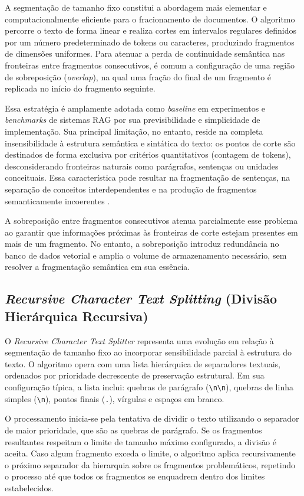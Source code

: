 \documentclass[
	12pt,				%
	openright,			%
	oneside,			%
	a4paper,			%
	tccpreliminar,		%
	]{ABNT-DC-UEL}
\begin{document}
A segmentação de tamanho fixo constitui a abordagem mais elementar e computacionalmente eficiente para o fracionamento de documentos. O algoritmo percorre o texto de forma linear e realiza cortes em intervalos regulares definidos por um número predeterminado de tokens ou caracteres, produzindo fragmentos de dimensões uniformes. Para atenuar a perda de continuidade semântica nas fronteiras entre fragmentos consecutivos, é comum a configuração de uma região de sobreposição (\textit{overlap}), na qual uma fração do final de um fragmento é replicada no início do fragmento seguinte.

Essa estratégia é amplamente adotada como \textit{baseline} em experimentos e \textit{benchmarks} de sistemas RAG \cite{wang2024bestpractices} por sua previsibilidade e simplicidade de implementação. Sua principal limitação, no entanto, reside na completa insensibilidade à estrutura semântica e sintática do texto: os pontos de corte são destinados de forma exclusiva por critérios quantitativos (contagem de tokens), desconsiderando fronteiras naturais como parágrafos, sentenças ou unidades conceituais. Essa característica pode resultar na fragmentação de sentenças, na separação de conceitos interdependentes e na produção de fragmentos semanticamente incoerentes \cite{barnett2024failure}.

A sobreposição entre fragmentos consecutivos atenua parcialmente esse problema ao garantir que informações próximas às fronteiras de corte estejam presentes em mais de um fragmento. No entanto, a sobreposição introduz redundância no banco de dados vetorial e amplia o volume de armazenamento necessário, sem resolver a fragmentação semântica em sua essência.

\subsection{\textit{Recursive Character Text Splitting} (Divisão Hierárquica Recursiva)}

O \textit{Recursive Character Text Splitter} representa uma evolução em relação à segmentação de tamanho fixo ao incorporar sensibilidade parcial à estrutura do texto. O algoritmo opera com uma lista hierárquica de separadores textuais, ordenados por prioridade decrescente de preservação estrutural. Em sua configuração típica, a lista inclui: quebras de parágrafo (\verb|\n\n|), quebras de linha simples (\verb|\n|), pontos finais (\verb|.|), vírgulas e espaços em branco.

O processamento inicia-se pela tentativa de dividir o texto utilizando o separador de maior prioridade, que são as quebras de parágrafo. Se os fragmentos resultantes respeitam o limite de tamanho máximo configurado, a divisão é aceita. Caso algum fragmento exceda o limite, o algoritmo aplica recursivamente o próximo separador da hierarquia sobre os fragmentos problemáticos, repetindo o processo até que todos os fragmentos se enquadrem dentro dos limites estabelecidos.
\end{document}
